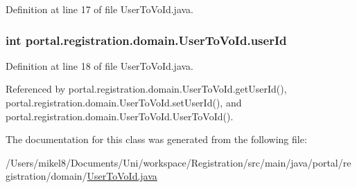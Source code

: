Definition at line 17 of file UserToVoId.java.

\hypertarget{classportal_1_1registration_1_1domain_1_1UserToVoId_ac0722add7861114db7fcf5242a1a8211}{
\subsubsection[{userId}]{\setlength{\rightskip}{0pt plus 5cm}int {\bf portal.registration.domain.UserToVoId.userId}}}
\label{classportal_1_1registration_1_1domain_1_1UserToVoId_ac0722add7861114db7fcf5242a1a8211}


Definition at line 18 of file UserToVoId.java.



Referenced by portal.registration.domain.UserToVoId.getUserId(), portal.registration.domain.UserToVoId.setUserId(), and portal.registration.domain.UserToVoId.UserToVoId().



The documentation for this class was generated from the following file:\begin{DoxyCompactItemize}
\item 
/Users/mikel8/Documents/Uni/workspace/Registration/src/main/java/portal/registration/domain/\hyperlink{UserToVoId_8java}{UserToVoId.java}\end{DoxyCompactItemize}
